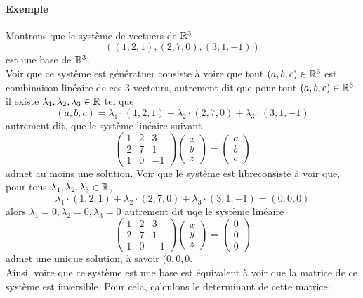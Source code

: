 \paragraph{Exemple} Montrons que le système de vectuers de $\mathbb{R}^3$ 
$$\left( (1, 2, 1), (2, 7, 0), (3, 1, -1) \right)$$
est une base de $\mathbb{R}^3$. \\
Voir que ce système est génératuer consiste à voire que tout $(a, b, c) \in \mathbb{R}^3$ est combinaison linéaire de ces 3 vecteurs, autrement dit que pour tout $(a, b, c) \in \mathbb{R}^3$ il existe $\lambda_1, \lambda_2, \lambda_3 \in \mathbb{R}$ tel que 
$$(a, b, c) = \lambda_1 \cdot (1, 2, 1) +\lambda_2 \cdot (2, 7, 0) + \lambda_3 \cdot (3, 1, -1)$$
autrement dit, que le système linéaire suivant
$$\begin{pmatrix}
  1 & 2 & 3 \\
  2 & 7 & 1 \\
  1 & 0 & -1
\end{pmatrix}
\begin{pmatrix}
  x \\
  y \\
  z 
\end{pmatrix}
=
\begin{pmatrix}
  a \\
  b \\
  c
\end{pmatrix}$$
admet au moins une solution. Voir que le système est libreconsiste à voir que, pour tous $\lambda_1, \lambda_2, \lambda_3 \in \mathbb{R}$, 
$$\lambda_1 \cdot (1, 2, 1) +\lambda_2 \cdot (2, 7, 0) + \lambda_3 \cdot (3, 1, -1) = (0, 0, 0)$$
alors $\lambda_1=0, \lambda_2=0, \lambda_3=0$ autrement dit uqe le système linéaire
$$\begin{pmatrix}
  1 & 2 & 3 \\
  2 & 7 & 1 \\
  1 & 0 & -1
\end{pmatrix}
\begin{pmatrix}
  x \\
  y \\
  z 
\end{pmatrix}
=
\begin{pmatrix}
  0 \\
  0 \\
  0
\end{pmatrix}$$
admet une unique solution, à savoir $(0, 0, 0$. \\
Ainsi, voire que ce système est une base est équivalent à voir que la matrice de ce système est inversible. Pour cela, calculons le déterminant de cette matrice:
